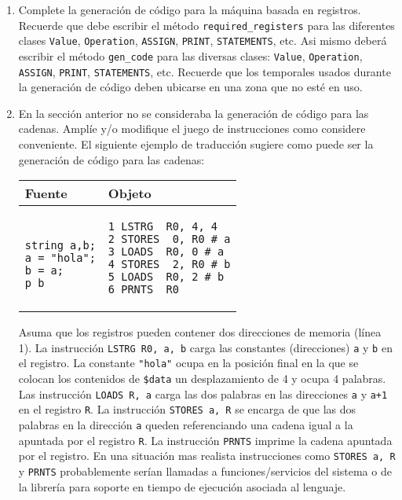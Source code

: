 \label{practica:generaciondecodigo}
\begin{enumerate}
\item
Complete la generación de código para la máquina basada en registros.
Recuerde que debe escribir el método \verb|required_registers|
para las diferentes clases \verb|Value|, \verb|Operation|,
\verb|ASSIGN|, \verb|PRINT|, \verb|STATEMENTS|, etc. 
Asi mismo deberá escribir el método \verb|gen_code| para las diversas
clases: \verb|Value|, \verb|Operation|, \verb|ASSIGN|, \verb|PRINT|,
\verb|STATEMENTS|, etc.
Recuerde que los temporales usados durante la generación de código
deben ubicarse en una zona que no esté en uso.


\item
En la sección anterior no se consideraba la generación 
de código para las cadenas. Amplíe y/o modifique el
juego de instrucciones como considere conveniente.
El siguiente ejemplo de traducción sugiere
como puede ser la generación de código para las cadenas:
\begin{center}
\begin{tabular}{|p{3cm}|p{11cm}|}
\hline
Fuente & Objeto\\
\hline
\begin{verbatim}

string a,b;
a = "hola";
b = a;
p b
\end{verbatim}
&
\begin{verbatim}
1 LSTRG  R0, 4, 4 
2 STORES  0, R0 # a
3 LOADS  R0, 0 # a
4 STORES  2, R0 # b
5 LOADS  R0, 2 # b
6 PRNTS  R0
\end{verbatim}\\
\hline
\end{tabular}
\end{center}

Asuma que los registros pueden contener dos direcciones de memoria
(línea 1). La instrucción \verb|LSTRG R0, a, b| carga las constantes
(direcciones)
\verb|a| y \verb|b| en el registro.
La constante \verb|"hola"| ocupa en  la posición final
en la que se colocan los contenidos de \verb|$data| un desplazamiento
de 4 y ocupa 4 palabras. 
Las instrucción \verb|LOADS R, a| carga las dos palabras en las direcciones
\verb|a| y \verb|a+1| en el registro \verb|R|. 
La instrucción \verb|STORES a, R| se encarga de que las dos palabras
en la dirección \verb|a| queden referenciando 
una cadena igual a la apuntada por el registro \verb|R|.
La instrucción \verb|PRNTS| imprime la cadena apuntada
por el registro.  En una situación mas realista instrucciones como
\verb|STORES a, R| y \verb|PRNTS| probablemente serían llamadas
a funciones/servicios del sistema o de la librería para soporte
en tiempo de ejecución asociada al lenguaje.


\end{enumerate}
